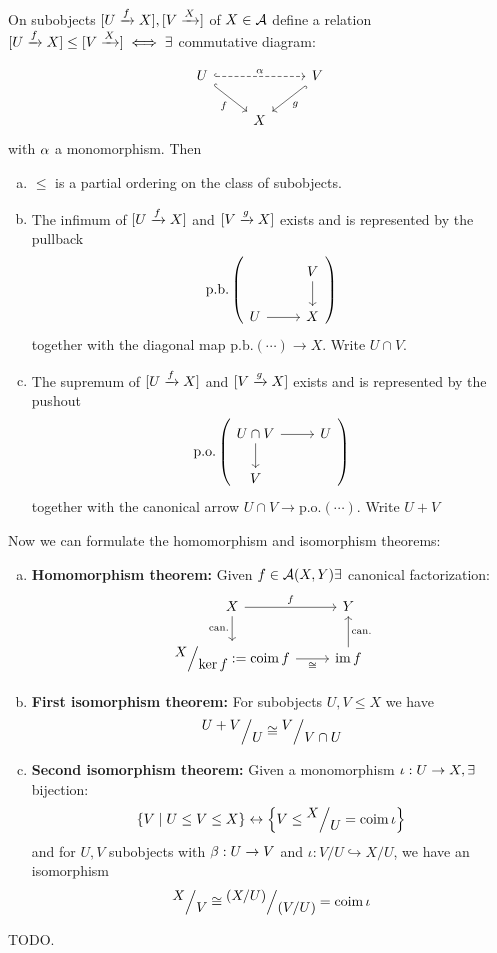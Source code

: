 \documentclass[a4paper]{report}
\begin{document}
\begin{prop}
  On subobjects $[U \xrightarrow f X], [V \xrightarrow X]$ of $X \in \mathcal{A}$ define a relation $[U \xrightarrow f X]\le [V \xrightarrow X] \iff \exists$ commutative diagram:

        \[\begin{tikzcd}
U \arrow[rd, "f"', hook] \arrow[rr, "\alpha", dashed, hook] &   & V \arrow[ld, "g", hook] \\
                                                      & X &
                                                    \end{tikzcd}\]with $\alpha$ a monomorphism. Then
\begin{enumerate}[(a)]
  \item $\le$ is a partial ordering on the class of subobjects.
  \item The infimum of $[U \xrightarrow f X]$ and $[V \xrightarrow g X]$ exists and is represented by the pullback \[\mathrm{p.b.}\l( \begin{tikzcd}
      & V \arrow[d] \\
      U \arrow[r] & X
                                                    \end{tikzcd} \r)\]
        together with the diagonal map $\mathrm{p.b.}(\cdots) \to X$. Write $U \cap V$.
  \item The supremum of $[U \xrightarrow f X]$ and $[V \xrightarrow g X]$ exists and is represented by the pushout
        \[\mathrm{p.o.}\l( \begin{tikzcd}
            U \cap V \arrow[d] \arrow[r]&  U\\
            V
          \end{tikzcd} \r)\]
        together with the canonical  arrow $U \cap V \to \mathrm{p.o.}(\cdots)$. Write $U + V$
\end{enumerate}
\end{prop}

\begin{rem}
  Now we can formulate the homomorphism and isomorphism theorems:
  \begin{enumerate}[(a)]
    \item \textbf{Homomorphism theorem:} Given $f \in \mathcal{A}(X,Y) \exists$ canonical factorization:
          \[\begin{tikzcd}
              X \arrow[r, "f"] \arrow[d, "\mathrm{can.}"'] & Y \\
              \displaystyle \fak X{\ker f} := \coim f \arrow[r, "\cong"'] & \im f \arrow[u, "\mathrm{can.}"']
            \end{tikzcd}\]
    \item \textbf{First isomorphism theorem:} For subobjects $U, V \le X$ we have \[\fak{U+V}U \cong \fak V{V \cap U}\]
    \item \textbf{Second isomorphism theorem:} Given a monomorphism $\iota : U \to X, \exists$ bijection:
          \[\l\{ V \mid U \le V \le X \r\} \leftrightarrow \l\{V \le \fak XU = \coim \iota\r\}\]
          and for $U, V$ subobjects with $\beta : U \to V$ and $\iota: V/U \hookrightarrow X/U$, we have an isomorphism \[\fak XV \cong \fak{(X/U)}{(V/U)} = \coim \iota\]
  \end{enumerate}

\end{rem}


\begin{thm}
  TODO.

\end{thm}
\end{document}
